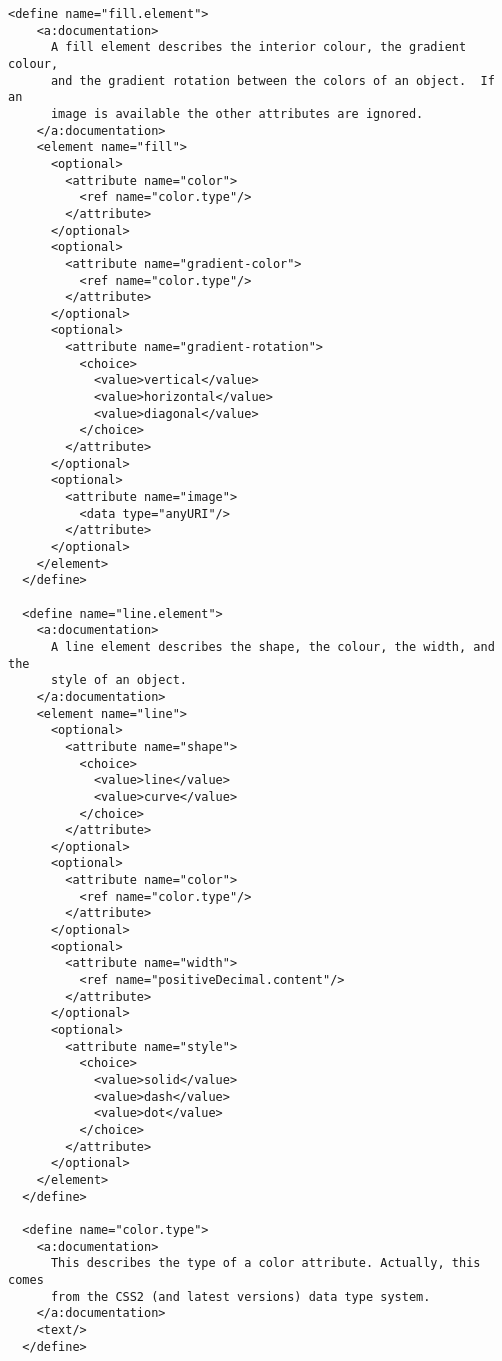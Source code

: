 \begin{lstlisting}[label=grammar_core,caption=RELAX NG implementation of PNML Core Model]
  <define name="fill.element">
    <a:documentation>
      A fill element describes the interior colour, the gradient colour,
      and the gradient rotation between the colors of an object.  If an
      image is available the other attributes are ignored.
    </a:documentation>
    <element name="fill">
      <optional>
        <attribute name="color">
          <ref name="color.type"/>
        </attribute>
      </optional>
      <optional>
        <attribute name="gradient-color">
          <ref name="color.type"/>
        </attribute>
      </optional>
      <optional>
        <attribute name="gradient-rotation">
          <choice>
            <value>vertical</value>
            <value>horizontal</value>
            <value>diagonal</value>
          </choice>
        </attribute>
      </optional>
      <optional>
        <attribute name="image">
          <data type="anyURI"/>
        </attribute>
      </optional>
    </element>
  </define>

  <define name="line.element">
    <a:documentation>
      A line element describes the shape, the colour, the width, and the 
      style of an object.
    </a:documentation>
    <element name="line">
      <optional>
        <attribute name="shape">
          <choice>
            <value>line</value>
            <value>curve</value>
          </choice>
        </attribute>
      </optional>
      <optional>
        <attribute name="color">
          <ref name="color.type"/>
        </attribute>
      </optional>
      <optional>
        <attribute name="width">
          <ref name="positiveDecimal.content"/>
        </attribute>
      </optional>
      <optional>
        <attribute name="style">
          <choice>
            <value>solid</value>
            <value>dash</value>
            <value>dot</value>
          </choice>
        </attribute>
      </optional>
    </element>
  </define>

  <define name="color.type">
    <a:documentation>
      This describes the type of a color attribute. Actually, this comes
      from the CSS2 (and latest versions) data type system.
    </a:documentation>
    <text/>
  </define>


\end{lstlisting}
